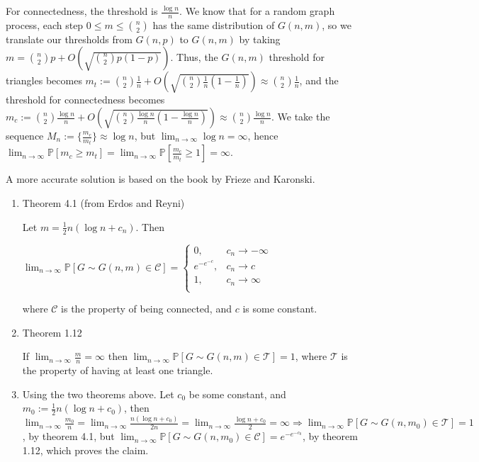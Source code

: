 \documentclass{article}
\begin{document}
For connectedness, the threshold is $\frac{\log{n}}{n}$.
We know that for a random graph process, each step $0\leq{m}\leq\binom{n}{2}$ has the same distribution of $G(n,m)$, so we translate our thresholds from $G(n,p)$ to $G(n,m)$ by taking $m=\binom{n}{2}p+O(\sqrt{\binom{n}{2}p(1-p)})$. Thus, the $G(n,m)$ threshold for triangles becomes $m_t:=\binom{n}{2}\frac{1}{n}+O(\sqrt{\binom{n}{2}\frac{1}{n}(1-\frac{1}{n})})\approx\binom{n}{2}\frac{1}{n}$, and the threshold for connectedness becomes $m_c:=\binom{n}{2}\frac{\log{n}}{n}+O(\sqrt{\binom{n}{2}\frac{\log{n}}{n}(1-\frac{\log{n}}{n})})\approx\binom{n}{2}\frac{\log{n}}{n}$. We take the sequence $M_n:=\{\frac{m_c}{m_t}\}\approx\log{n}$, but $\lim_{n\rightarrow\infty}\log{n}=\infty$, hence $\lim_{n\rightarrow\infty}\mathbb{P}[m_c\geq{m_t}]=\lim_{n\rightarrow\infty}\mathbb{P}[\frac{m_c}{m_t}\geq{1}]=\infty$.

A more accurate solution is based on the book by Frieze and Karonski.
\begin{enumerate}
    \item Theorem 4.1 (from Erdos and Reyni)

    Let $m=\frac{1}{2}n(\log{n}+c_n)$. Then

    $\lim_{n\rightarrow\infty}\mathbb{P}[G\sim{G(n,m)}\in\mathcal{C}]=\begin{cases}
        0, & c_n\rightarrow{-\infty} \\
        e^{-e^{-c}}, & c_n\rightarrow{c} \\
        1, & c_n\rightarrow\infty \\
    \end{cases}$

    where $\mathcal{C}$ is the property of being connected, and $c$ is some constant.

    \item Theorem 1.12
    
    If $\lim_{n\rightarrow\infty}\frac{m}{n}=\infty$ then $\lim_{n\rightarrow\infty}\mathbb{P}[G\sim{G(n,m)}\in\mathcal{T}]=1$, where $\mathcal{T}$ is the property of having at least one triangle.

    \item Using the two theorems above. Let $c_0$ be some constant, and $m_0:=\frac{1}{2}n(\log{n}+c_0)$, then $\lim_{n\rightarrow\infty}\frac{m_0}{n}=\lim_{n\rightarrow\infty}\frac{n(\log{n}+c_0)}{2n}=\lim_{n\rightarrow\infty}\frac{\log{n}+c_0}{2}=\infty\Rightarrow{\lim_{n\rightarrow\infty}\mathbb{P}[G\sim{G(n,m_0)}\in\mathcal{T}]}=1$, by theorem 4.1, but $\lim_{n\rightarrow\infty}\mathbb{P}[G\sim{G(n,m_0)}\in\mathcal{C}]=e^{-e^{-c_0}}$, by theorem 1.12, which proves the claim.
    
\end{enumerate}
\end{document}
